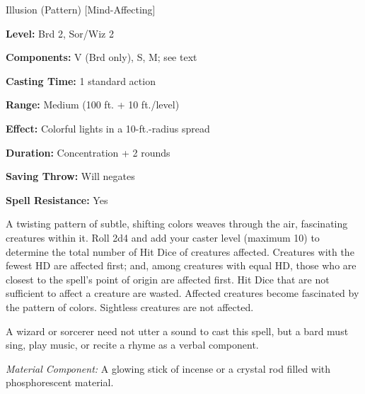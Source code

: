 
Illusion (Pattern) [Mind-Affecting]

\textbf{Level:} Brd 2, Sor/Wiz 2

\textbf{Components:} V (Brd only), S, M; see text

\textbf{Casting Time:} 1 standard action

\textbf{Range:} Medium (100 ft. + 10 ft./level)

\textbf{Effect:} Colorful lights in a 10-ft.-radius spread

\textbf{Duration:} Concentration + 2 rounds

\textbf{Saving Throw:} Will negates

\textbf{Spell Resistance:} Yes

A twisting pattern of subtle, shifting colors weaves through the air, fascinating 
creatures within it. Roll 2d4 and add your caster level (maximum 10) to determine 
the total number of Hit Dice of creatures affected. Creatures with the fewest HD 
are affected first; and, among creatures with equal HD, those who are closest to 
the spell's point of origin are affected first. Hit Dice that are not sufficient 
to affect a creature are wasted. Affected creatures become fascinated by the pattern 
of colors. Sightless creatures are not affected.

A wizard or sorcerer need not utter a sound to cast this spell, but a bard must 
sing, play music, or recite a rhyme as a verbal component.

\textit{Material Component:} A glowing stick of incense or a crystal rod filled 
with phosphorescent material.

